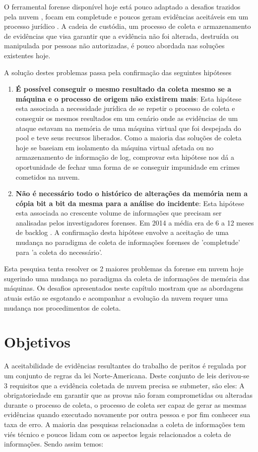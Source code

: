 \documentclass[12pt,				%
	openright,			%
	oneside,			%
	a4paper,			%
	english,			%
	brazil				%
	]{abntex2}
\begin{document}
O ferramental forense disponível hoje está pouco adaptado a desafios trazidos pela nuvem \cite{Dykstra2012a}, focam em completude e poucos geram evidências aceitáveis em um 
processo jurídico \cite{Reichert2015}. A cadeia de custódia, um processo de coleta e armazenamento de evidências que visa garantir que a evidência não foi alterada, destruída 
ou manipulada por pessoas não autorizadas, é pouco abordada nas soluções existentes hoje. 

A solução destes problemas passa pela confirmação das seguintes hipóteses

\begin{enumerate}
 \item \textbf{É possível conseguir o mesmo resultado da coleta mesmo se a máquina e o processo de origem não existirem mais}: Esta hipótese esta associada a necessidade jurídica de se 
 repetir o processo de coleta e conseguir os mesmos resultados em um cenário onde as evidências de um ataque estavam na memória de uma máquina virtual que foi despejada do pool e
 teve seus recursos liberados.
 Como a maioria das soluções de coleta hoje se baseiam em isolamento da máquina virtual afetada ou no armazenamento de informação de log, comprovar esta hipótese nos dá
 a oportunidade de fechar uma forma de se conseguir impunidade em crimes cometidos na nuvem.
 \item \textbf{Não é necessário todo o histórico de alterações da memória nem a cópia bit a bit da mesma para a análise do incidente}: Esta hipótese esta associada ao crescente
 volume de informações que precisam ser analisadas pelos investigadores forenses. Em 2014 a média era de 6 a 12 meses de backlog \cite{Quick2014}. A confirmação desta hipótese
 envolve a aceitação de uma mudança no paradigma de coleta de informações forenses de 'completude' para 'a coleta do necessário'.
\end{enumerate}

Esta pesquisa tenta resolver os 2 maiores problemas da forense em nuvem hoje sugerindo uma mudança no paradigma da coleta de informações de memória das máquinas. Os desafios apresentados
neste capítulo mostram que as abordagens atuais estão se esgotando e acompanhar a evolução da nuvem requer uma mudança nos procedimentos de coleta.

\chapter{Objetivos} \label{chap:obj}
A aceitabilidade de evidências resultantes do trabalho de peritos é regulada por um conjunto de regras da lei Norte-Americana. Deste conjunto de leis derivou-se 3 requisitos que
a evidência coletada de nuvem precisa se submeter, são eles: A obrigatoriedade em garantir que as provas não foram comprometidas ou alteradas durante o processo de coleta, o processo
de coleta ser capaz de gerar as mesmas evidências quando executado novamente por outra pessoa e por fim conhecer sua taxa de erro. A maioria das pesquisas relacionadas a coleta de 
informações tem viés técnico e poucos lidam com os aspectos legais relacionados a coleta de informações. Sendo assim temos:\\
\end{document}
